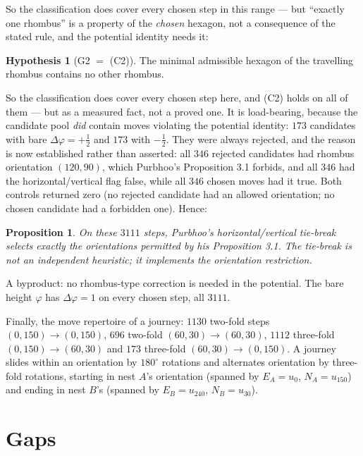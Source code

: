 \documentclass[11pt]{article}
\theoremstyle{plain}
\newtheorem{proposition}[theorem]{Proposition}
\theoremstyle{definition}
\newtheorem{hypothesis}[theorem]{Hypothesis}
\begin{document}
So the classification does cover every chosen step in this range --- but
``exactly one rhombus'' is a property of the \emph{chosen} hexagon, not a
consequence of the stated rule, and the potential identity needs it:

\begin{hypothesis}[G2 $=$ (C2)]\label{hyp:G2}
The minimal admissible hexagon of the travelling rhombus contains no other
rhombus.
\end{hypothesis}

So the classification does cover every chosen step here, and (C2) holds on all of
them --- but as a measured fact, not a proved one.  It is load-bearing, because the
candidate pool \emph{did} contain moves violating the potential identity: $173$
candidates with bare $\Delta\varphi=+\tfrac12$ and $173$ with $-\tfrac12$.  They
were always rejected, and the reason is now established rather than asserted: all $346$ rejected
candidates had rhombus orientation $(120,90)$, which Purbhoo's Proposition 3.1
forbids, and all $346$ had the horizontal/vertical flag false, while all $346$
chosen moves had it true.  Both controls returned zero (no rejected candidate had
an allowed orientation; no chosen candidate had a forbidden one).  Hence:

\begin{proposition}
On these $3111$ steps, Purbhoo's horizontal/vertical tie-break selects exactly
the orientations permitted by his Proposition 3.1.  The tie-break is not an
independent heuristic; it implements the orientation restriction.
\end{proposition}

A byproduct: no rhombus-type correction is needed in the potential.  The bare
height $\varphi$ has $\Delta\varphi=1$ on every chosen step, all $3111$.

Finally, the move repertoire of a journey: $1130$ two-fold steps
$(0,150)\to(0,150)$, $696$ two-fold $(60,30)\to(60,30)$, $1112$ three-fold
$(0,150)\to(60,30)$ and $173$ three-fold $(60,30)\to(0,150)$.  A journey slides
within an orientation by $180^\circ$ rotations and alternates orientation by
three-fold rotations, starting in nest $A$'s orientation (spanned by $E_A=u_0$,
$N_A=u_{150}$) and ending in nest $B$'s (spanned by $E_B=u_{240}$, $N_B=u_{30}$).

\section*{Gaps}
\end{document}
